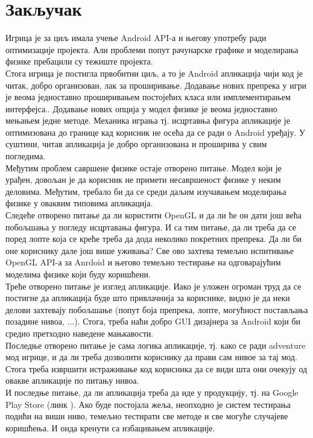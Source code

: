\chapter{Закључак} \label{Conclusion}

Игрица је за циљ имала учење Android API-а и његову употребу ради оптимизације пројекта. Али проблеми попут рачунарске графике и моделирања физике пребацили су тежиште пројекта.  
\\ \indent Стога игрица је постигла првобитни циљ, а то је Android апликација чији код је читак, добро организован, лак за проширивање. Додавање нових препрека у игри је веома једноставно проширивањем постојећих класа или имплементирањем интерфејса.. Додавање нових опција у модел физике је веома једноставно мењањем једне методе. Механика играња тј. исцртавња фигура апликације је оптимизована до границе кад корисник не осећа да се ради о Android уређају. У суштини, читав апликација је добро организована и проширива у свим погледима. 
\\ \indent Међутим проблем савршене физике остаје отворено питање. Модел који је урађен, довољан је да корисник не примети несавршеност физике у неким деловима. Међутим, требало би да се среди даљим изучавањем моделирања физике у оваквим типовима апликација. 
\\ \indent Следеће отворено питање да ли користити OpenGL и да ли ће он дати још већа побољшања у погледу исцртавања фигура. И са тим питање, да ли треба да се поред лопте која се креће треба да дода неколико покретних препрека. Да ли би оне кориснику дале још више уживања? Све ово захтева темељно испитивање OpenGL API-а за Anrdoid и његово темељно тестирање на одговарајућим моделима физике који буду коришћени.
\\ \indent Треће отворено питање је изглед апликације. Иако је уложен огроман  труд да се постигне да апликација буде што привлачнија за кориснике, видно је да неки делови захтевају побољшање (попут боја препрека, лопте, могућност постављања позадине нивоа, ...).  Стога, треба наћи добро GUI дизајнера за Android који би средио претходно наведене мањкавости. 
\\ \indent Последње отворено питање је сама логика апликације, тј. како се ради adventure мод игрице, и да ли треба дозволити кориснику да прави сам нивое за тај мод. Стога треба извршити истраживање код корисника да се види шта они очекују од овакве апликације по питању нивоа.
\\ \indent И последње питање, да ли апликација треба да иде у продукцију, тј. на Google Play Store (линк \cite{GooglePlayStore}). Ако буде постојала жеља, неопходно је систем тестирања подићи на виши ниво, темељно тестирати све методе и све могуће случајеве коришћења. И онда кренути са избацивањем апликације.